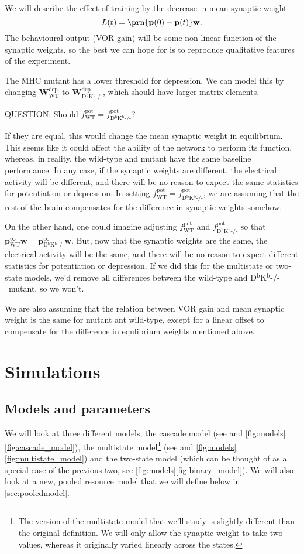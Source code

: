 \documentclass[12pt]{article}
\newcommand{\pr}{\mathbf{p}}
\newcommand{\eq}{\pr^\infty}
\newcommand{\w}{\mathbf{w}}
\newcommand{\W}{\mathbf{W}}
\newcommand{\pot}{^{\text{pot}}}
\newcommand{\dep}{^{\text{dep}}}
\newcommand{\wt}{_{\text{WT}}}
\newcommand{\ko}{_{\text{D$^\mathrm{b}$K$^\mathrm{b}$-/-}}}
\newcommand{\KO}{D$^\mathrm{b}$K$^\mathrm{b}$-/-}
\begin{document}
We will describe the effect of training by the decrease in mean synaptic weight:
%
\begin{equation}\label{eq:learning}
  L(t) = \prn{\pr(0)-\pr(t)}\w.
\end{equation}
%
The behavioural output (VOR gain) will be some non-linear function of the synaptic weights, so the best we can hope for is to reproduce qualitative features of the experiment.

The MHC mutant has a lower threshold for depression.
We can model this by changing $\W\dep\wt$ to $\W\dep\ko$, which should have larger matrix elements.

QUESTION: Should $f\pot\wt=f\pot\ko$?

If they are equal, this would change the mean synaptic weight in equilibrium.
This seems like it could affect the ability of the network to perform its function, whereas, in reality, the wild-type and mutant have the same baseline performance.
In any case, if the synaptic weights are different, the electrical activity will be different, and there will be no reason to expect the same statistics for potentiation or depression.
In setting $f\pot\wt=f\pot\ko$, we are assuming that the rest of the brain compensates for the difference in synaptic weights somehow.

On the other hand, one could imagine adjusting $f\pot\wt$ and $f\pot\ko$ so that $\eq\wt\w = \eq\ko\w$.
But, now that the synaptic weights are the same, the electrical activity will be the same, and there will be no reason to expect different statistics for potentiation or depression.
If we did this for the multistate or two-state models, we'd remove all differences between the wild-type and \KO\ mutant, so we won't.

We are also assuming that the relation between VOR gain and mean synaptic weight is the same for mutant ant wild-type, except for a linear offset to compensate for the difference in equlibrium weights mentioned above.


\section{Simulations}\label{sec:sims}

\subsection{Models and parameters}

We will look at three different models, the cascade model (see \cite{Fusi2005cascade} and \autoref{fig:models}\ref{fig:cascade_model}), the multistate model\footnote{The version of the multistate model that we'll study is slightly different than the original definition. We will only allow the synaptic weight to take two values, whereas it originally varied linearly across the states. } (see \cite{amit1994learning,Fusi2007multistate} and \autoref{fig:models}\ref{fig:multistate_model}) and the two-state model (which can be thought of as a special case of the previous two, see \autoref{fig:models}\ref{fig:binary_model}).
We will also look at a new, pooled resource model that we will define below in \autoref{sec:pooledmodel}.
\end{document}
